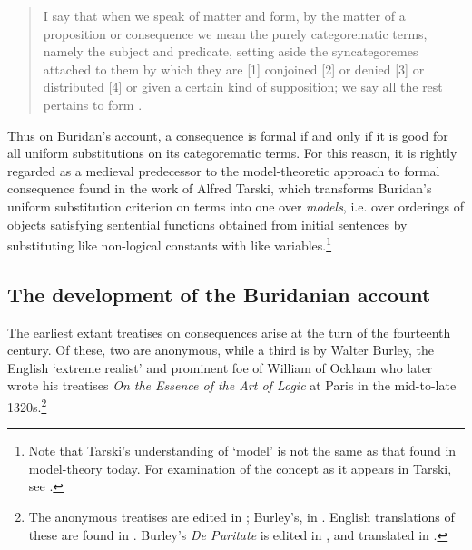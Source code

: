 \documentclass[]{article}
\begin{document}
\begin{quote}
	I say that when we speak of matter and form, by the matter of a proposition or consequence we mean the purely categorematic terms, namely the subject and predicate, setting aside the syncategoremes attached to them by which they are [1] conjoined [2] or denied [3] or distributed [4] or given a certain kind of supposition; we say all the rest pertains to form \autocite[I. 7, p. 74]{Buridan2015}.
\end{quote}
Thus on Buridan's account, a consequence is formal if and only if it is good for all uniform substitutions on its categorematic terms. For this reason, it is rightly regarded as a medieval predecessor to the model-theoretic approach to formal consequence found in the work of Alfred Tarski,\autocite{DutilhNovaes2012a} which transforms Buridan's uniform substitution criterion on terms into one over \textit{models}, i.e. over orderings of objects satisfying sentential functions obtained from initial sentences by substituting like non-logical constants with like variables.\footnote{Note that Tarski's understanding of `model' is not the same as that found in model-theory today. For examination of the concept as it appears in Tarski, see \autocite{Bays2001,Gomez-Torrente2009}.}

\subsection{The development of the Buridanian account}
The earliest extant treatises on consequences arise at the turn of the fourteenth century. Of these, two are anonymous, while a third is by Walter Burley, the English `extreme realist' and prominent foe of William of Ockham who later wrote his treatises \textit{On the Essence of the Art of Logic} at Paris in the mid-to-late 1320s.\footnote{The anonymous treatises are edited in \autocite{Green-Pedersen1980a}; Burley's, in \autocite{Green-Pedersen1980b}. English translations of these are found in \autocite{Archambault2017d}. Burley's \textit{De Puritate} is edited in \autocite{BurleyDPAL}, and translated in \autocite{Burley2000}.}
\end{document}
